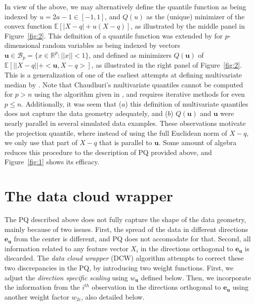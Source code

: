 \documentclass[twoside]{article}
\newcommand{\mbfeu}{\mathbf{e}_{\mathbf u} }
\begin{document}
In view of the above, we may alternatively define the quantile 
function as being indexed by $u = 2 a - 1 \in [-1, 1]$, and $Q (u)$ as the 
(unique) minimizer of the convex function 
$\mathbb{E} \left[ | X - q| + u (X - q) \right]$, as illustrated by the 
middle panel in Figure~\ref{fig:2}. This definition of a quantile function was extended 
by \cite{Chaudhuri96} for $p$-dimensional random variables as being indexed 
by vectors 
 $\mathbf{u} \in \mathcal{B}_{p} = \{ x  \in \mathbb{R}^{p}: || x || < 1 \}$, and 
 defined as minimizers $Q (\mathbf{u} )$ of 
$\mathbb{E} \left[ || X - q|| + <\mathbf{u},  X - q> \right]$, as illustrated in the 
right panel of Figure~\ref{fig:2}. This is a generalization of one of the 
earliest attempts at defining multivariate median by \cite{Haldane48}.
Note that Chaudhuri's multivariate quantiles cannot be 
computed for $p > n$ using the algorithm given in \cite{Chaudhuri96}, and requires
iterative methods for even $p \leq n$. 
Additionally, it was seem that ($a$) this definition of 
multivariate quantiles does not capture the data geometry adequately, and ($b$) 
$Q (\mathbf{u})$ and $\mathbf{u}$ were nearly parallel in several simulated data examples. 
These observations motivate the projection quantile, where instead of using 
the full Euclidean norm of $X - q$, we only use that part of $X - q$ that is parallel 
to $\mathbf{u}$. Some amount of algebra reduces this procedure to the description 
of PQ provided above, and Figure~\ref{fig:1} shows its efficacy. 


 
 
 \section{The data cloud wrapper}
 \label{sec:DCWTheory}
 
The PQ described above does not fully capture the shape of the data geometry, 
mainly because of two issues. First, the spread of the data in different directions 
$\mbfeu$ from the center is different, and PQ does not accomodate for that. Second, 
all information  related to any feature vector $X_{i}$ in the directions orthogonal 
to $\mbfeu$ is discarded. The {\it data cloud wrapper} (DCW) algorithm attempts 
to correct these two discrepancies in the PQ, by introducing two weight functions. 
First, we adjust the {\it direction specific scaling} using $w_{\mathbf{u}}$ 
defined below. Then, we incorporate the information from the $i^{th}$  observation 
in the directions orthogonal to $\mbfeu$ using another weight factor $w_{2i}$, also 
detailed below.
 
\end{document}
